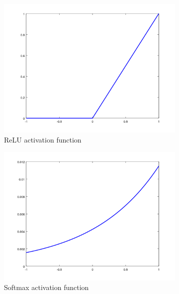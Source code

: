 \begin{description}
	\begin{figure}
		\centering
		\begin{subfigure}{0.5\textwidth}
			\centering
			\includegraphics[width=1\linewidth]{figures/relu.png}
			\caption{ReLU activation function}\label{fig:relu}
		\end{subfigure}%
		\begin{subfigure}{0.5\textwidth}
			\centering
			\includegraphics[width=1\linewidth]{figures/softmax.png}
			\caption{Softmax activation function}\label{fig:softmax}
		\end{subfigure}
		\caption[Activation functions]{}
		\label{fig:activations}
	\end{figure}
	
\end{description}

